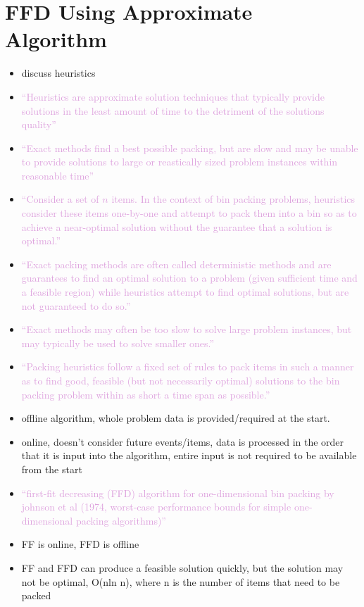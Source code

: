 \documentclass[oribibl]{llncs}
\begin{document}
\section{FFD Using Approximate Algorithm}
\label{sec:ffdapprox}
\begin{itemize}
	\item discuss heuristics
	\item \textcolor{Plum}{``Heuristics are approximate solution techniques that typically provide solutions in the least amount of time to the detriment of the solutions quality''}
	\item \textcolor{Plum}{``Exact methods find a best possible packing, but are slow and may be unable to provide solutions to large or reastically sized problem instances within reasonable time''}
	\item \textcolor{Plum}{``Consider a set of $n$ items. In the context of bin packing problems, heuristics consider these items one-by-one and attempt to pack them into a bin so as to achieve a near-optimal solution without the guarantee that a solution is optimal.''}
	\item \textcolor{Plum}{``Exact packing methods are often called deterministic methods and are guarantees to find an optimal solution to a problem (given sufficient time and a feasible region) while heuristics attempt to find optimal solutions, but are not guaranteed to do so.''}
	\item \textcolor{Plum}{``Exact methods may often be too slow to solve large problem instances, but may typically be used to solve smaller ones.''}
	\item \textcolor{Plum}{``Packing heuristics follow a fixed set of rules to pack items in such a manner as to find good, feasible (but not necessarily optimal) solutions to the bin packing problem within as short a time span as possible.''}
	\item offline algorithm, whole problem data is provided/required at the start.
	\item online, doesn't consider future events/items, data is processed in the order that it is input into the algorithm, entire input is not required to be available from the start
	\item \textcolor{Plum}{``first-fit decreasing (FFD) algorithm for one-dimensional bin packing by johnson et al (1974, worst-case performance bounds for simple one-dimensional packing algorithms)''}
	\item FF is online, FFD is offline
	\item FF and FFD can produce a feasible solution quickly, but the solution may not be optimal, O(nln n), where n is the number of items that need to be packed

\end{itemize}
\end{document}
